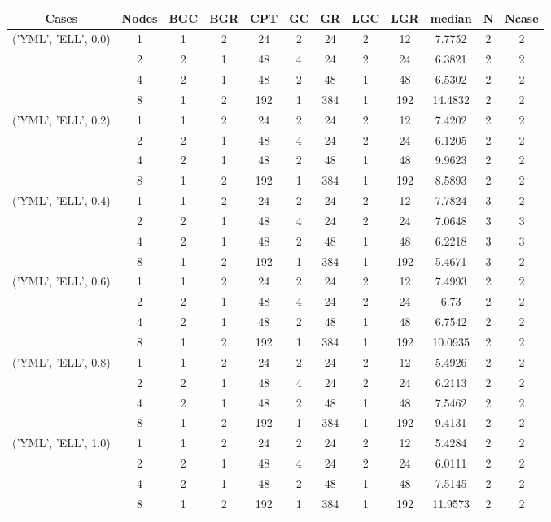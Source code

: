 \begin{tabular}{cccccccccccc}
\hline
Cases & Nodes& BGC& BGR& CPT& GC& GR& LGC& LGR& median & N & Ncase \\
\hline
\multirow{4}{*}{('YML', 'ELL', 0.0)}& 1& 1& 2& 24& 2& 24& 2& 12& 7.7752& 2& 2\\
& 2& 2& 1& 48& 4& 24& 2& 24& 6.3821& 2& 2\\
& 4& 2& 1& 48& 2& 48& 1& 48& 6.5302& 2& 2\\
& 8& 1& 2& 192& 1& 384& 1& 192& 14.4832& 2& 2\\
\hline
\multirow{4}{*}{('YML', 'ELL', 0.2)}& 1& 1& 2& 24& 2& 24& 2& 12& 7.4202& 2& 2\\
& 2& 2& 1& 48& 4& 24& 2& 24& 6.1205& 2& 2\\
& 4& 2& 1& 48& 2& 48& 1& 48& 9.9623& 2& 2\\
& 8& 1& 2& 192& 1& 384& 1& 192& 8.5893& 2& 2\\
\hline
\multirow{4}{*}{('YML', 'ELL', 0.4)}& 1& 1& 2& 24& 2& 24& 2& 12& 7.7824& 3& 2\\
& 2& 2& 1& 48& 4& 24& 2& 24& 7.0648& 3& 3\\
& 4& 2& 1& 48& 2& 48& 1& 48& 6.2218& 3& 3\\
& 8& 1& 2& 192& 1& 384& 1& 192& 5.4671& 3& 2\\
\hline
\multirow{4}{*}{('YML', 'ELL', 0.6)}& 1& 1& 2& 24& 2& 24& 2& 12& 7.4993& 2& 2\\
& 2& 2& 1& 48& 4& 24& 2& 24& 6.73& 2& 2\\
& 4& 2& 1& 48& 2& 48& 1& 48& 6.7542& 2& 2\\
& 8& 1& 2& 192& 1& 384& 1& 192& 10.0935& 2& 2\\
\hline
\multirow{4}{*}{('YML', 'ELL', 0.8)}& 1& 1& 2& 24& 2& 24& 2& 12& 5.4926& 2& 2\\
& 2& 2& 1& 48& 4& 24& 2& 24& 6.2113& 2& 2\\
& 4& 2& 1& 48& 2& 48& 1& 48& 7.5462& 2& 2\\
& 8& 1& 2& 192& 1& 384& 1& 192& 9.4131& 2& 2\\
\hline
\multirow{4}{*}{('YML', 'ELL', 1.0)}& 1& 1& 2& 24& 2& 24& 2& 12& 5.4284& 2& 2\\
& 2& 2& 1& 48& 4& 24& 2& 24& 6.0111& 2& 2\\
& 4& 2& 1& 48& 2& 48& 1& 48& 7.5145& 2& 2\\
& 8& 1& 2& 192& 1& 384& 1& 192& 11.9573& 2& 2\\
\hline
\end{tabular}

